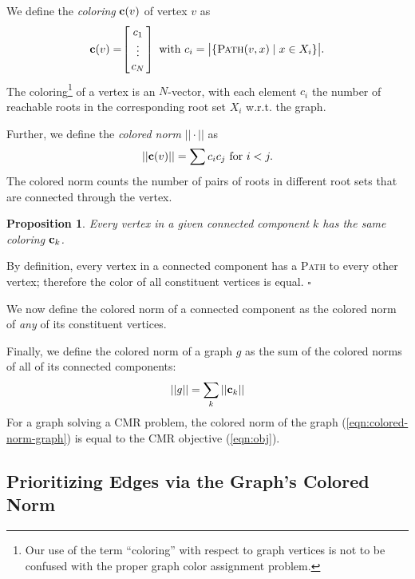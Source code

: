 \documentclass{report}
\newtheorem{proposition}{Proposition}
\newenvironment{proof}[1][Proof]{\begin{trivlist}
   \item[\hskip \labelsep {\bfseries #1}]}{\hfill$\square$\end{trivlist}}
\newcommand{\cdnote}[1]{{\xxnote{CD}{blue}{#1}}}
\newcommand{\xxnote}[3]{}
\renewcommand{\xxnote}[3]{\color{#2}{#1: #3}}
\begin{document}
We define the \emph{coloring} ${\bf c}(v)$ of vertex $v$ as
\begin{equation}
   \arraycolsep=1.4pt
   {\bf c}(v) = \hspace{-0.03in} \left[\begin{array}{c}
   c_1 \\ \vdots \\ c_N \\
   \end{array}\right]
   \mbox{ with }
   c_i = \big| \{
      \textsc{Path}(v,x) \;|\; x \in X_i
      \} \big|.
\end{equation}
The coloring\footnote{
Our use of the term ``coloring'' with respect to graph vertices
is not to be confused with the proper graph color assignment problem.}
of a vertex is an $N$-vector,
with each element $c_i$ the number of reachable roots
in the corresponding root set $X_i$ w.r.t. the graph.

Further, we define the \emph{colored norm} $||\cdot||$ as
\begin{equation}
   ||{\bf c}(v)|| = \sum c_i c_j \mbox{ for } i < j.
\end{equation}
The colored norm counts the number of pairs of roots in different root sets
that are connected through the vertex. 

\begin{proposition}
Every vertex in a given connected component $k$ has the same coloring
${\bf c}_k$.
\end{proposition}
\begin{proof}
By definition, every vertex in a connected component has a
\textsc{Path} to every other vertex;
therefore the color of all constituent vertices is equal.
\end{proof}

We now define the colored norm of a connected component as the colored norm
of \emph{any} of its constituent vertices.

Finally, we define the colored norm of a graph $g$
as the sum of the colored norms of all of its connected components:
\begin{equation}
   \label{eqn:colored-norm-graph}
   ||g|| = \sum_k ||{\bf c}_k||
\end{equation}
For a graph solving a CMR problem,
the colored norm of the graph (\ref{eqn:colored-norm-graph})
is equal to the CMR objective (\ref{eqn:obj}).

\subsection{Prioritizing Edges via the Graph's Colored Norm}
\end{document}
